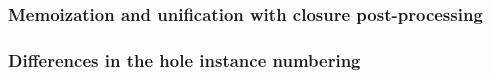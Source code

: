 \subsubsection{Memoization and unification with closure post-processing}
\label{sec:renumbering_memoization}

\subsubsection{Differences in the hole instance numbering}
\label{sec:differences_numbering}



